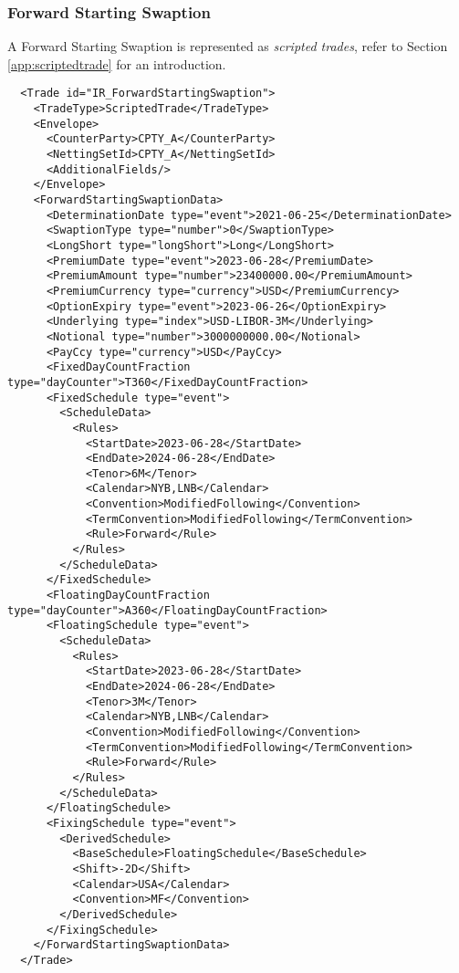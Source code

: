 \subsubsection{Forward Starting Swaption}
 
 
A Forward Starting Swaption is represented as {\em scripted trades}, refer to Section
\ref{app:scriptedtrade} for an introduction.
 
\begin{verbatim} 
  <Trade id="IR_ForwardStartingSwaption">
    <TradeType>ScriptedTrade</TradeType>
    <Envelope>
      <CounterParty>CPTY_A</CounterParty>
      <NettingSetId>CPTY_A</NettingSetId>
      <AdditionalFields/>
    </Envelope>
    <ForwardStartingSwaptionData>
      <DeterminationDate type="event">2021-06-25</DeterminationDate>
      <SwaptionType type="number">0</SwaptionType>
      <LongShort type="longShort">Long</LongShort>
      <PremiumDate type="event">2023-06-28</PremiumDate>
      <PremiumAmount type="number">23400000.00</PremiumAmount>
      <PremiumCurrency type="currency">USD</PremiumCurrency>
      <OptionExpiry type="event">2023-06-26</OptionExpiry>
      <Underlying type="index">USD-LIBOR-3M</Underlying>
      <Notional type="number">3000000000.00</Notional>
      <PayCcy type="currency">USD</PayCcy>
      <FixedDayCountFraction type="dayCounter">T360</FixedDayCountFraction>
      <FixedSchedule type="event">
        <ScheduleData>
          <Rules>
            <StartDate>2023-06-28</StartDate>
            <EndDate>2024-06-28</EndDate>
            <Tenor>6M</Tenor>
            <Calendar>NYB,LNB</Calendar>
            <Convention>ModifiedFollowing</Convention>
            <TermConvention>ModifiedFollowing</TermConvention>
            <Rule>Forward</Rule>
          </Rules>
        </ScheduleData>
      </FixedSchedule>
      <FloatingDayCountFraction type="dayCounter">A360</FloatingDayCountFraction>
      <FloatingSchedule type="event">
        <ScheduleData>
          <Rules>
            <StartDate>2023-06-28</StartDate>
            <EndDate>2024-06-28</EndDate>
            <Tenor>3M</Tenor>
            <Calendar>NYB,LNB</Calendar>
            <Convention>ModifiedFollowing</Convention>
            <TermConvention>ModifiedFollowing</TermConvention>
            <Rule>Forward</Rule>
          </Rules>
        </ScheduleData>
      </FloatingSchedule>
      <FixingSchedule type="event">
        <DerivedSchedule>
          <BaseSchedule>FloatingSchedule</BaseSchedule>
          <Shift>-2D</Shift>
          <Calendar>USA</Calendar>
          <Convention>MF</Convention>
        </DerivedSchedule>
      </FixingSchedule>
    </ForwardStartingSwaptionData>
  </Trade>
\end{verbatim} 
 

